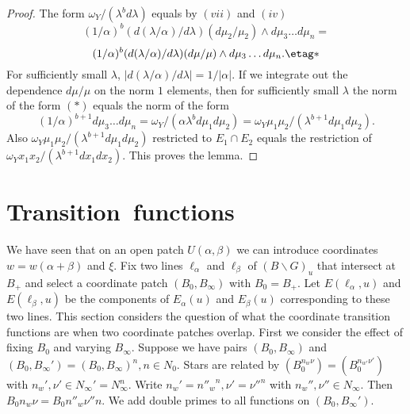 \documentclass{memo-l}
\theoremstyle{definition}
\theoremstyle{remark}
\numberwithin{section}{chapter}
\numberwithin{equation}{chapter}
\begin{document}
\begin{proof}
   The form ${\omega}_{Y}/({\lambda}^{b}d{\lambda})$ equals by $(vii)$ and
$(iv)$
$$
(1/{\alpha})^{b}(d({\lambda}/{\alpha})/d{\lambda})(d{\mu}_{2}/{\mu}_{2})\wedge
d{\mu}_{3}\ldots d{\mu}_{n} =
$$
$$
(1/{\alpha})^{b}(d({\lambda}/{\alpha})/d{\lambda})(d{\mu}/{\mu})\wedge
d{\mu}_{3}\ldots d{\mu}_{n} . \etag *
$$
For sufficiently small ${\lambda}$, $\vert
d({\lambda}/{\alpha})/d{\lambda}\vert = 1/\vert {\alpha}\vert .$ If we
integrate out the dependence $d{\mu}/{\mu}$ on the norm $1$ elements, then
for sufficiently small ${\lambda}$ the norm of the form $(*)$ equals the
norm of the form
$$
(1/{\alpha})^{b+1}d{\mu}_{3}\ldots d{\mu}_{n} =
{\omega}_{Y}/({\alpha}{\lambda}^{b}d{\mu}_{1}d{\mu}_{2}) =
{\omega}_{Y}{\mu}_{1}{\mu}_{2}/({\lambda}^{b+1}d{\mu}_{1}d{\mu}_{2}).
$$
Also ${\omega}_{Y}{\mu}_{1}{\mu}_{2}/({\lambda}^{b+1}d{\mu}_{1}d{\mu}_{2})$
restricted to $E_{1} \cap E_{2}$ equals the restriction of
\newline
${\omega}_{Y}x_{1}x_{2}/({\lambda}^{b+1}dx_{1}dx_{2})$.  This proves the
lemma.
\end{proof} 

\section{Transition\ functions}

   We have seen that on an open patch $U({\alpha},{\beta})$ we can
introduce coordinates $w = w({\alpha}+{\beta})$ and ${\xi}$.  Fix two lines
${\ell}_{{\alpha}}$ and ${\ell}_{{\beta}}$ of $(B\backslash G)_{u}$ that
intersect at $B_{+}$ and select a coordinate patch $(B_{0},B_{{\infty}})$
with $B_{0} = B_{+}$.  Let $E({\ell}_{{\alpha}},u)$ and
$E({\ell}_{{\beta}},u)$ be the components of $E_{{\alpha}}(u)$ and
$E_{{\beta}}(u)$ corresponding to these two lines.  This section considers
the question of what the coordinate transition functions are when two
coordinate patches overlap.  First we consider the effect of fixing $B_{0}$
and varying $B_{{\infty}}$.  Suppose we have pairs $(B_{0},B_{{\infty}})$
and $(B_{0},B_{{\infty}}') = (B_{0},B_{{\infty}})^{n}, n  \in  N_{0}$.
Stars are related by $(B_{0}^{n_w\nu}) = (B_{0}^{n_{w'}\nu'})$ with 
$n_{w}', {\nu}' \in N_{{\infty}}' =
N_{{\infty}}^{n}$.  Write $n_{w}' = {n''_w}^n, {\nu}' = {\nu''}^{n}$ with
$n_{w}'', {\nu''} \in  N_{{\infty}}$.  Then $B_{0}n_{w}{\nu} =
B_{0}n''_{w}{\nu''}n$.  We add double primes to all functions on
$(B_{0},B_{{\infty}}')$.
\end{document}
